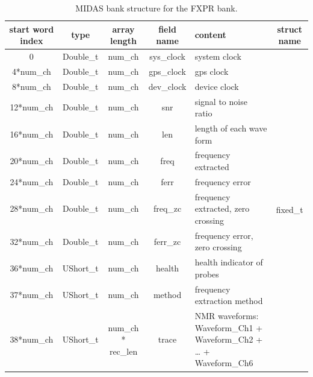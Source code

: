\begin{table}[htbp]
\centering
\caption{MIDAS bank structure for the FXPR bank.}
\begin{tabular}{|c|c|c|c|p{4cm}|c|}
\hline
start word index & type      & array length       & field name & content                                                          & struct name \\
\hline
0                & Double\_t & num\_ch            & sys\_clock & system clock                                                     & \multirow{12}{*}{fixed\_t}                  \\
\cline{1-5}
4*num\_ch        & Double\_t & num\_ch            & gps\_clock & gps clock                                                        &                             \\
\cline{1-5}
8*num\_ch        & Double\_t & num\_ch            & dev\_clock & device clock                                                     &                             \\
\cline{1-5}
12*num\_ch       & Double\_t & num\_ch            & snr        & signal to noise ratio                                            &                             \\
\cline{1-5}
16*num\_ch       & Double\_t & num\_ch            & len        & length of each wave form                                         &                             \\
\cline{1-5}
20*num\_ch       & Double\_t & num\_ch            & freq       & frequency extracted                                              &                             \\
\cline{1-5}
24*num\_ch       & Double\_t & num\_ch            & ferr       & frequency error                                                  &                             \\
\cline{1-5}
28*num\_ch       & Double\_t & num\_ch            & freq\_zc   & frequency extracted, zero crossing                               &                             \\
\cline{1-5}
32*num\_ch       & Double\_t & num\_ch            & ferr\_zc   & frequency error, zero crossing                                   &                             \\
\cline{1-5}
36*num\_ch       & UShort\_t & num\_ch            & health     & health indicator of probes                                       &                             \\
\cline{1-5}
37*num\_ch       & UShort\_t & num\_ch            & method     & frequency extraction method                                      &                             \\
\cline{1-5}
38*num\_ch       & UShort\_t & num\_ch * rec\_len & trace      & NMR waveforms: Waveform\_Ch1 + Waveform\_Ch2 + … + Waveform\_Ch6 &     \\    
\hline
\end{tabular} 
\label{tab:fxprtable}
\end{table}


